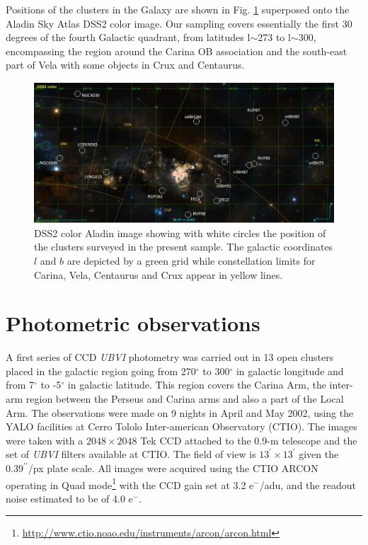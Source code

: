 \documentclass[draft]{aa}
\begin{document}
Positions of the clusters in the Galaxy are shown in Fig. \ref{fig1} superposed
onto the Aladin Sky Atlas DSS2 color image. Our sampling covers essentially the
first 30 degrees of the fourth Galactic quadrant, from latitudes l$\sim$273 to
l$\sim$300, encompassing the region around the Carina OB association and the
south-east part of Vela with some objects in Crux and Centaurus.

\begin{figure}[ht]
    \centering
    \includegraphics[width=\hsize]{../figs/DSS2color.png}
    \caption{DSS2 color Aladin image showing with white circles the position of
    the clusters surveyed in the present sample. The galactic coordinates $l$
    and $b$ are depicted by a green grid while constellation limits for Carina,
    Vela, Centaurus and Crux appear in yellow lines.}
    \label{fig1}
\end{figure}




\section{Photometric observations}
\label{sec:photo_obs}

A first series of CCD \emph{UBVI} photometry was carried out in 13 open clusters
placed in the galactic region going from 270$^\circ$ to 300$^\circ$ in galactic
longitude and from 7$^\circ$ to -5$^\circ$ in galactic latitude. This region
covers the Carina Arm, the inter-arm region between the Perseus and Carina arms
and also a part of the Local Arm.
%
The observations were made on 9 nights in April and May 2002, using the YALO
facilities at Cerro Tololo Inter-american Observatory (CTIO). The images were
taken with a $2048\times2048$ Tek CCD attached to the 0.9-m telescope and the
set of \textit{UBVI} filters available at CTIO. The field of view is
$13^\prime\times13^\prime$ given the $0.39^{\prime\prime}$/px plate scale.
All images were acquired using the CTIO ARCON operating in Quad
mode\footnote{\url{http://www.ctio.noao.edu/instruments/arcon/arcon.html}} with
the CCD gain set at 3.2 e$^-$/adu, and the readout noise estimated to be of
4.0 e$^-$.
\end{document}
